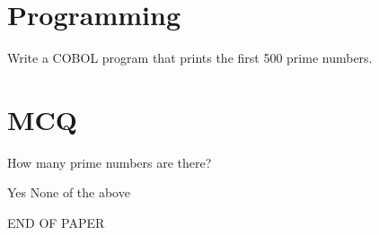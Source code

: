 \documentclass[11pt,a4paper]{exam}
\begin{document}


\newpage
\begin{questions}

\section*{\textbf{Programming}}

\question[1]

Write a COBOL program that prints the first 500 prime numbers.

\fillwithdottedlines{5in}

\section*{\textbf{MCQ}}

\question[1]

How many prime numbers are there?

\begin{choices}
  \choice Yes
  \choice None of the above
\end{choices}

\vfill
\begin{center}
\Large\textsf{END OF PAPER}
\end{center}

\end{questions}
\end{document}
